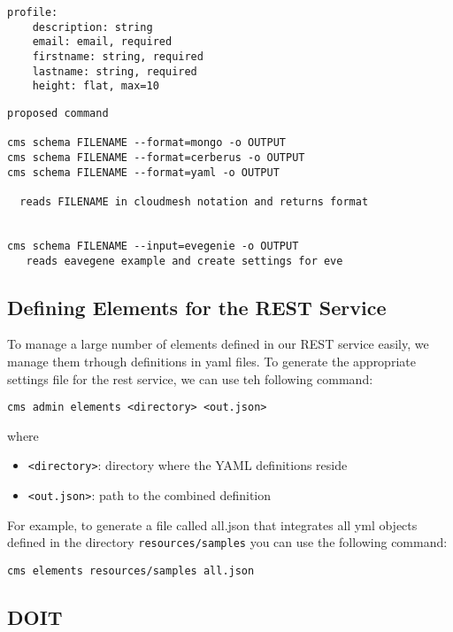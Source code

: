 \documentclass[9pt,twocolumn]{styles/osajnl}
\begin{document}
\begin{Verbatim}
profile:
    description: string
    email: email, required
    firstname: string, required
    lastname: string, required
    height: flat, max=10
\end{Verbatim}

\begin{Verbatim}
proposed command

cms schema FILENAME --format=mongo -o OUTPUT
cms schema FILENAME --format=cerberus -o OUTPUT
cms schema FILENAME --format=yaml -o OUTPUT

  reads FILENAME in cloudmesh notation and returns format


cms schema FILENAME --input=evegenie -o OUTPUT
   reads eavegene example and create settings for eve
\end{Verbatim}


\subsection{Defining Elements for the REST Service}

To manage a large number of elements defined in our REST service
easily, we manage them trhough definitions in yaml files. To generate
the appropriate settings file for the rest service, we can use teh
following command:

\begin{verbatim}
cms admin elements <directory> <out.json>
\end{verbatim}

where

\begin{itemize}
\item \verb+<directory>+: directory where the YAML definitions reside
\item \verb+<out.json>+: path to the combined definition
\end{itemize}

For example, to generate a file called all.json that integrates all
yml objects defined in the directory \verb+resources/samples+ you can
use the following command:

\begin{verbatim}
cms elements resources/samples all.json
\end{verbatim}

\subsection{DOIT}
\end{document}
